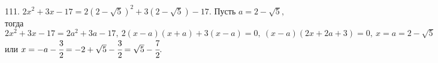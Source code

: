 111. $2x^2+3x-17=2(2-\sqrt{5})^2+3(2-\sqrt{5})-17.$ Пусть $a=2-\sqrt{5},$ тогда $2x^2+3x-17=2a^2+3a-17,\ 2(x-a)(x+a)+3(x-a)=0,\ (x-a)(2x+2a+3)=0,\ x=a=2-\sqrt{5}$ или $x=-a-\cfrac{3}{2}=-2+\sqrt{5}-\cfrac{3}{2}=\sqrt{5}-\cfrac{7}{2}.$\\
